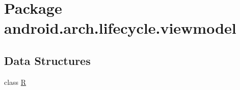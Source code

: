 \hypertarget{namespaceandroid_1_1arch_1_1lifecycle_1_1viewmodel}{}\section{Package android.\+arch.\+lifecycle.\+viewmodel}
\label{namespaceandroid_1_1arch_1_1lifecycle_1_1viewmodel}
\subsection*{Data Structures}
\begin{DoxyCompactItemize}
\item 
class \mbox{\hyperlink{classandroid_1_1arch_1_1lifecycle_1_1viewmodel_1_1_r}{R}}
\end{DoxyCompactItemize}
